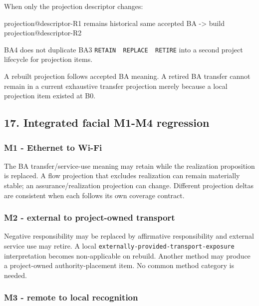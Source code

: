 \documentclass[
  11pt,
  a4paper,
]{article}
\newenvironment{Shaded}{}{}
\newcommand{\NormalTok}[1]{#1}
\begin{document}
When only the projection descriptor changes:

\begin{Shaded}
\begin{Highlighting}[]
\NormalTok{projection@descriptor{-}R1 remains historical}
\NormalTok{same accepted BA}
\NormalTok{    {-}\textgreater{} build projection@descriptor{-}R2}
\end{Highlighting}
\end{Shaded}

BA4 does not duplicate BA3
\texttt{RETAIN\ \textbar{}\ REPLACE\ \textbar{}\ RETIRE} into a second
project lifecycle for projection items.

A rebuilt projection follows accepted BA meaning. A retired BA transfer
cannot remain in a current exhaustive transfer projection merely because
a local projection item existed at B0.

\subsection{17. Integrated facial M1-M4
regression}\label{integrated-facial-m1-m4-regression}

\subsubsection{M1 - Ethernet to Wi-Fi}\label{m1---ethernet-to-wi-fi}

The BA transfer/service-use meaning may retain while the realization
proposition is replaced. A flow projection that excludes realization can
remain materially stable; an assurance/realization projection can
change. Different projection deltas are consistent when each follows its
own coverage contract.

\subsubsection{M2 - external to project-owned
transport}\label{m2---external-to-project-owned-transport}

Negative responsibility may be replaced by affirmative responsibility
and external service use may retire. A local
\texttt{externally-provided-transport-exposure} interpretation becomes
non-applicable on rebuild. Another method may produce a project-owned
authority-placement item. No common method category is needed.

\subsubsection{M3 - remote to local
recognition}\label{m3---remote-to-local-recognition}
\end{document}
